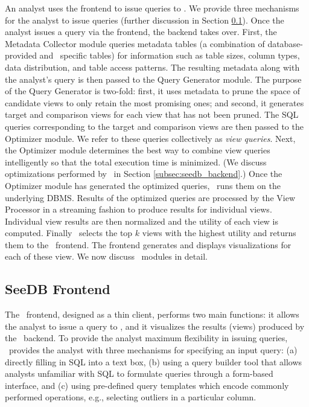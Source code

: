 An analyst uses the frontend to issue queries to \SeeDB. We provide three
mechanisms for the analyst to issue queries (further discussion in
Section \ref{subsec:seedb_frontend}).
Once the analyst issues a query via the frontend, the backend takes over.
First, the Metadata Collector module queries metadata tables (a combination of
database-provided and \SeeDB\ specific tables) for information such as table
sizes, column types, data distribution, and table access patterns.
The resulting metadata along with the analyst's query is then passed to the
Query Generator module. The purpose of the Query Generator is two-fold:
first, it uses metadata to prune the space of candidate views to only retain the
most promising ones; and second, it generates target and comparison views for
each view that has not been pruned.
The SQL queries corresponding to the target and comparison views are then passed
to the Optimizer module. We refer to these queries collectively as {\it view
queries}.
Next, the Optimizer module determines the best way to
combine view queries intelligently so that the total execution time is
minimized.
(We discuss optimizations performed by \SeeDB\ in Section
\ref{subsec:seedb_backend}.) Once the Optimizer module has generated the
optimized queries, \SeeDB\ runs them on the underlying DBMS.
Results of the optimized queries are processed by the View Processor in a
streaming fashion to produce results for individual views. Individual view
results are then normalized and the utility of each view is computed.
Finally \SeeDB\ selects the top $k$ views with the highest utility and returns
them to the \SeeDB\ frontend. The frontend generates 
and displays visualizations for each of these view. We now discuss
\SeeDB\ modules in detail.

\subsection{SeeDB Frontend}
\label{subsec:seedb_frontend}

The \SeeDB\ frontend, designed as a thin client, performs two main functions: it
allows the analyst to issue a query to \SeeDB, 
and it visualizes the results (views) produced by the \SeeDB\
backend.
To provide the analyst maximum flexibility in issuing queries, \SeeDB\
provides the analyst with three
mechanisms for specifying an input query: 
(a) directly filling in SQL into a text box, 
(b) using a query builder tool that allows analysts
unfamiliar with SQL to formulate queries through a form-based interface, and (c)
using pre-defined query templates which encode commonly performed operations,
e.g., selecting outliers in a particular column. 

